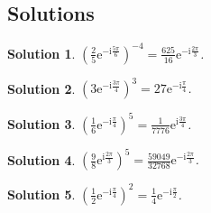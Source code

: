 \documentclass[a4paper]{article}
\newtheorem{solution}{Solution}
\begin{document}
\subsection*{Solutions}
\begin{solution}
$\displaystyle \left(\frac{2}{5}\mathrm{e}^{-\mathrm{i}\frac{5 \pi }{6}}\right)^{-4}=\frac{625}{16}\mathrm{e}^{-\mathrm{i}\frac{2 \pi }{3}}$.\end{solution}
\begin{solution}
$\displaystyle \left(3\mathrm{e}^{-\mathrm{i}\frac{3 \pi }{4}}\right)^{3}=27\mathrm{e}^{-\mathrm{i}\frac{\pi }{4}}$.\end{solution}
\begin{solution}
$\displaystyle \left(\frac{1}{6}\mathrm{e}^{-\mathrm{i}\frac{\pi }{4}}\right)^{5}=\frac{1}{7776}\mathrm{e}^{\mathrm{i}\frac{3 \pi }{4}}$.\end{solution}
\begin{solution}
$\displaystyle \left(\frac{9}{8}\mathrm{e}^{\mathrm{i}\frac{2 \pi }{3}}\right)^{5}=\frac{59049}{32768}\mathrm{e}^{-\mathrm{i}\frac{2 \pi }{3}}$.\end{solution}
\begin{solution}
$\displaystyle \left(\frac{1}{2}\mathrm{e}^{-\mathrm{i}\frac{\pi }{4}}\right)^{2}=\frac{1}{4}\mathrm{e}^{-\mathrm{i}\frac{\pi }{2}}$.\end{solution}
\end{document}
